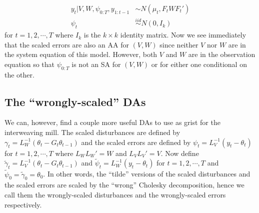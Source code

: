 \documentclass{article}
\begin{document}
\begin{align*}
  y_t|V,W,\psi_{0:T},y_{1:t-1} &\sim N(\mu_t, F_tWF_t')\\
  \psi_t & \stackrel{iid}{\sim} N(0,I_k)
\end{align*}
for $t=1,2,\cdots,T$ where $I_k$ is the $k\times k$ identity matrix. Now we see immediately that the scaled errors are also an AA for $(V,W)$ since neither $V$ nor $W$ are in the system equation of this model. However, both $V$ and $W$ are in the observation equation so that $\psi_{0:T}$ is not an SA for $(V,W)$ or for either one conditional on the other.

\subsection{The ``wrongly-scaled'' DAs}
We can, however, find a couple more useful DAs to use as grist for the interweaving mill. The scaled disturbances are defined by $\gamma_t = L_W^{-1}(\theta_t - G_t\theta_{t-1})$  and the scaled errors are defined by $\psi_t = L_V^{-1}(y_t - \theta_t)$ for $t=1,2,\cdots,T$ where $L_WL_W' = W$ and $L_VL_V' = V$. Now define $\tilde{\gamma}_t=L_V^{-1}(\theta_t - G_t\theta_{t-1})$ and $\tilde{\psi}_t=L_W^{-1}(y_t - \theta_t)$ for $t=1,2,\cdots,T$ and $\tilde{\psi}_0=\tilde{\gamma}_0=\theta_0$. In other words, the ``tilde'' versions of the scaled disturbances and the scaled errors are scaled by the ``wrong'' Cholesky decomposition, hence we call them the wrongly-scaled disturbances and the wrongly-scaled errors respectively. 
\end{document}
